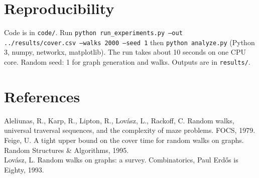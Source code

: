 \documentclass[10pt,twocolumn]{article}
\begin{document}
\section{Reproducibility}
Code is in \texttt{code/}. Run \texttt{python run\_experiments.py --out ../results/cover.csv --walks 2000 --seed 1} then \texttt{python analyze.py} (Python 3, numpy, networkx, matplotlib). The run takes about 10 seconds on one CPU core. Random seed: 1 for graph generation and walks. Outputs are in \texttt{results/}.

\section*{References}
\small
Aleliunas, R., Karp, R., Lipton, R., Lov\'asz, L., Rackoff, C. Random walks, universal traversal sequences, and the complexity of maze problems. FOCS, 1979.\\
Feige, U. A tight upper bound on the cover time for random walks on graphs. Random Structures \& Algorithms, 1995.\\
Lov\'asz, L. Random walks on graphs: a survey. Combinatorics, Paul Erd\H{o}s is Eighty, 1993.
\end{document}
